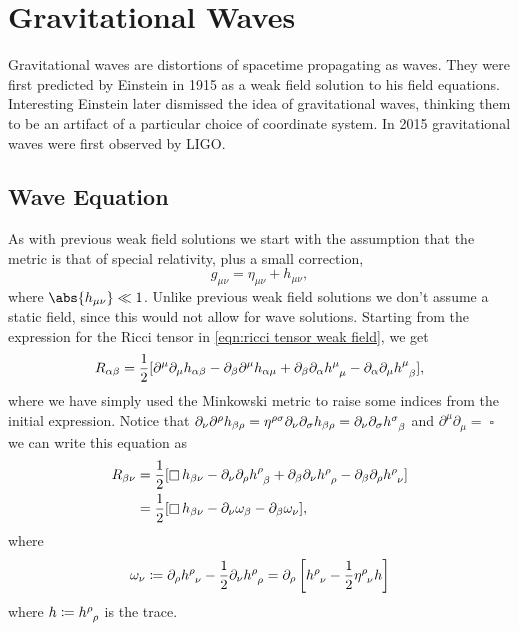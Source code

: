 \documentclass[fleqn]{NotesClass}
\newcommand*{\dalembertian}{\mathop{\square}}
\begin{document}
    \chapter{Gravitational Waves}
    Gravitational waves are distortions of spacetime propagating as waves.
    They were first predicted by Einstein in 1915 as a weak field solution to his field equations.
    Interesting Einstein later dismissed the idea of gravitational waves, thinking them to be an artifact of a particular choice of coordinate system.
    In 2015 gravitational waves were first observed by LIGO.
    
    \section{Wave Equation}
    As with previous weak field solutions we start with the assumption that the metric is that of special relativity, plus a small correction,
    \begin{equation}
        g_{\mu\nu} = \eta_{\mu\nu} + h_{\mu\nu},
    \end{equation}
    where \(\abs{h_{\mu\nu}} \ll 1\).
    Unlike previous weak field solutions we don't assume a static field, since this would not allow for wave solutions.
    Starting from the expression for the Ricci tensor in \cref{eqn:ricci tensor weak field}, we get
    \begin{equation}
        R_{\alpha\beta} = \frac{1}{2}[\partial^\mu\partial_\mu h_{\alpha\beta} - \partial_\beta\partial^\mu h_{\alpha\mu} + \partial_\beta\partial_\alpha\tensor{h}{^\mu_\mu} - \partial_\alpha\partial_\mu \tensor{h}{^\mu_\beta}],
    \end{equation}
    where we have simply used the Minkowski metric to raise some indices from the initial expression.
    Notice that \(\partial_\nu\partial^\rho h_{\beta\rho} = \eta^{\rho\sigma}\partial_\nu\partial_\sigma h_{\beta\rho} = \partial_\nu\partial_\sigma\tensor{h}{^\sigma_\beta}\) and \(\partial^\mu\partial_\mu = \dalembertian\) we can write this equation as
    \begin{align}
        R_{\beta\nu} &= \frac{1}{2}[\dalembertian h_{\beta\nu} - \partial_\nu\partial_\rho \tensor{h}{^\rho_\beta} + \partial_\beta\partial_\nu \tensor{h}{^\rho_\rho} - \partial_\beta \partial_\rho \tensor{h}{^\rho_\nu}]\\
        &= \frac{1}{2}[\dalembertian h_{\beta\nu} - \partial_\nu \omega_\beta - \partial_\beta \omega_\nu],
    \end{align}
    where
    \begin{equation}
        \omega_\nu \coloneqq \partial_\rho \tensor{h}{^\rho_\nu} - \frac{1}{2}\partial_\nu\tensor{h}{^\rho_\rho} = \partial_\rho\left[ \tensor{h}{^\rho_\nu} - \frac{1}{2}\tensor{\eta}{^\rho_\nu}h \right]
    \end{equation}
    where \(h \coloneqq \tensor{h}{^\rho_\rho}\) is the trace.
    
\end{document}
